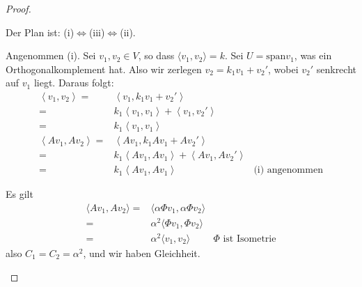 \begin{proof}
	\begin{parts}
	\item Der Plan ist: (i)$\iff$(iii)$\iff$(ii).

		Angenommen (i). Sei $v_1,v_2\in V$, so dass $\langle v_1,v_2\rangle=k$. Sei $U=\text{span}v_1$, was ein Orthogonalkomplement hat. Also wir zerlegen $v_2=k_1v_1+v_2'$, wobei $v_2'$ senkrecht auf $v_1$ liegt. Daraus folgt:
		\begin{align*}
			\left<v_1,v_2 \right> =&\left<v_1,k_1 v_1+v_2' \right>\\
			=&k_1\left<v_1,v_1 \right>+\left<v_1,v_2' \right>\\
			=&k_1\left<v_1,v_1 \right>\\
			\left<Av_1,Av_2 \right> =& \left<Av_1,k_1 Av_1+Av_2' \right>\\
			=&k_1 \left<Av_1,Av_1 \right>+ \left<Av_1,Av_2' \right>\\
			=&k_1\left<Av_1,Av_1 \right> & \text{(i) angenommen}
		\end{align*}
	\item Es gilt
		\begin{align*}
			\langle Av_1, Av_2\rangle =& \langle \alpha \Phi v_1, \alpha\Phi v_2\rangle \\
			=&\alpha^2 \langle \Phi v_1, \Phi v_2\rangle\\
			=&\alpha^2 \langle v_1, v_2\rangle & \Phi\text{ ist Isometrie}
		\end{align*}
		also $C_1=C_2=\alpha^2$, und wir haben Gleichheit.
	\end{parts}
\end{proof}
